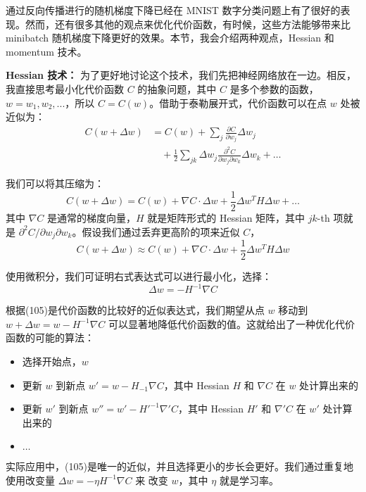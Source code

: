 通过反向传播进行的随机梯度下降已经在 MNIST 数字分类问题上有了很好的表现。然而，还有很多其他的观点来优化代价函数，有时候，这些方法能够带来比 minibatch 随机梯度下降更好的效果。本节，我会介绍两种观点，Hessian 和 momentum 技术。

\textbf{Hessian 技术：} 为了更好地讨论这个技术，我们先把神经网络放在一边。相反，我直接思考最小化代价函数 $C$ 的抽象问题，其中 $C$ 是多个参数的函数，$w=w_1,w_2,...$，所以 $C=C(w)$。借助于泰勒展开式，代价函数可以在点 $w$ 处被近似为：
\begin{align}
  C(w+\Delta w) &= C(w) + \sum_j \frac{\partial C}{\partial w_j} \Delta w_j \nonumber \\
     & \quad + \frac{1}{2} \sum_{jk} \Delta w_j \frac{\partial^2 C}{\partial w_j \partial w_k} \Delta w_k + \ldots \label{eq:103}\tag{103}
\end{align}

我们可以将其压缩为：
\begin{equation}
  C(w+\Delta w) = C(w) + \nabla C \cdot \Delta w +
  \frac{1}{2} \Delta w^T H \Delta w + \ldots
  \label{eq:104}\tag{104}
\end{equation}
其中 $\nabla C$ 是通常的梯度向量，$H$ 就是矩阵形式的 Hessian 矩阵，其中 $jk$-th 项就是 $\partial^2 C/\partial w_j\partial w_k$。假设我们通过丢弃更高阶的项来近似 $C$，
\begin{equation} 
  C(w+\Delta w) \approx C(w) + \nabla C \cdot \Delta w +
  \frac{1}{2} \Delta w^T H \Delta w
  \label{eq:105}\tag{105}
\end{equation}

使用微积分，我们可证明右式表达式可以进行最小化，选择：
\begin{equation}
  \Delta w = -H^{-1} \nabla C
  \label{eq:106}\tag{106}
\end{equation}

根据(105)是代价函数的比较好的近似表达式，我们期望从点 $w$ 移动到 $w+\Delta w = w - H^{-1}\nabla C$ 可以显著地降低代价函数的值。这就给出了一种优化代价函数的可能的算法：
\begin{itemize}
\item 选择开始点，$w$
\item 更新 $w$ 到新点 $w' = w - H_{-1}\nabla C$，其中 Hessian $H$ 和 $\nabla C$ 在 $w$ 处计算出来的
\item 更新  $w'$ 到新点 $w'' = w' - H'^{-1}\nabla' C$，其中 Hessian $H'$ 和 $\nabla' C$ 在 $w'$ 处计算出来的
\item $\ldots$
\end{itemize}

实际应用中，(105)是唯一的近似，并且选择更小的步长会更好。我们通过重复地使用改变量 $\Delta w = -\eta H^{-1} \nabla C$ 来 改变 $w$，其中 $\eta$ 就是学习率。

